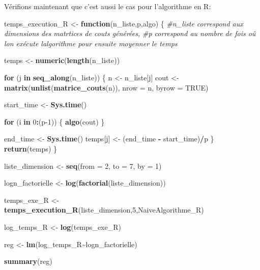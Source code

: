 \documentclass[
]{article}
\newenvironment{Shaded}{\begin{snugshade}}{\end{snugshade}}
\newcommand{\AttributeTok}[1]{\textcolor[rgb]{0.13,0.29,0.53}{#1}}
\newcommand{\CommentTok}[1]{\textcolor[rgb]{0.56,0.35,0.01}{\textit{#1}}}
\newcommand{\ConstantTok}[1]{\textcolor[rgb]{0.56,0.35,0.01}{#1}}
\newcommand{\ControlFlowTok}[1]{\textcolor[rgb]{0.13,0.29,0.53}{\textbf{#1}}}
\newcommand{\DecValTok}[1]{\textcolor[rgb]{0.00,0.00,0.81}{#1}}
\newcommand{\FunctionTok}[1]{\textcolor[rgb]{0.13,0.29,0.53}{\textbf{#1}}}
\newcommand{\NormalTok}[1]{#1}
\newcommand{\OtherTok}[1]{\textcolor[rgb]{0.56,0.35,0.01}{#1}}
\newcommand{\SpecialCharTok}[1]{\textcolor[rgb]{0.81,0.36,0.00}{\textbf{#1}}}
\begin{document}
Vérifions maintenant que c'est aussi le cas pour l'algorithme en R:

\begin{Shaded}
\begin{Highlighting}[]
\NormalTok{temps\_execution\_R }\OtherTok{\textless{}{-}} \ControlFlowTok{function}\NormalTok{(n\_liste,p,algo) \{}
  \CommentTok{\#n\_liste correspond aux dimensions des matrtices de couts générées,}
  \CommentTok{\#p correspond au nombre de fois oû l\textquotesingle{}on exécute l\textquotesingle{}algorithme pour ensuite moyenner le temps}

\NormalTok{  temps }\OtherTok{\textless{}{-}} \FunctionTok{numeric}\NormalTok{(}\FunctionTok{length}\NormalTok{(n\_liste))}
  
  \ControlFlowTok{for}\NormalTok{ (j }\ControlFlowTok{in} \FunctionTok{seq\_along}\NormalTok{(n\_liste)) \{}
\NormalTok{    n }\OtherTok{\textless{}{-}}\NormalTok{ n\_liste[j]}
\NormalTok{    cout }\OtherTok{\textless{}{-}} \FunctionTok{matrix}\NormalTok{(}\FunctionTok{unlist}\NormalTok{(}\FunctionTok{matrice\_couts}\NormalTok{(n)), }\AttributeTok{nrow =}\NormalTok{ n, }\AttributeTok{byrow =} \ConstantTok{TRUE}\NormalTok{)}
    
\NormalTok{    start\_time }\OtherTok{\textless{}{-}} \FunctionTok{Sys.time}\NormalTok{()}
    
    \ControlFlowTok{for}\NormalTok{ (i }\ControlFlowTok{in} \DecValTok{0}\SpecialCharTok{:}\NormalTok{(p}\DecValTok{{-}1}\NormalTok{)) \{}
    \FunctionTok{algo}\NormalTok{(cout)}
\NormalTok{    \}}
    
\NormalTok{    end\_time }\OtherTok{\textless{}{-}} \FunctionTok{Sys.time}\NormalTok{()}
\NormalTok{    temps[j] }\OtherTok{\textless{}{-}}\NormalTok{ (end\_time }\SpecialCharTok{{-}}\NormalTok{ start\_time)}\SpecialCharTok{/}\NormalTok{p}
\NormalTok{  \}}
  \FunctionTok{return}\NormalTok{(temps)}
\NormalTok{\}}
\end{Highlighting}
\end{Shaded}

\begin{Shaded}
\begin{Highlighting}[]
\NormalTok{liste\_dimension }\OtherTok{\textless{}{-}} \FunctionTok{seq}\NormalTok{(}\AttributeTok{from =} \DecValTok{2}\NormalTok{, }\AttributeTok{to =} \DecValTok{7}\NormalTok{, }\AttributeTok{by =} \DecValTok{1}\NormalTok{)}

\NormalTok{logn\_factorielle }\OtherTok{\textless{}{-}} \FunctionTok{log}\NormalTok{(}\FunctionTok{factorial}\NormalTok{(liste\_dimension))}

\NormalTok{temps\_exe\_R }\OtherTok{\textless{}{-}} \FunctionTok{temps\_execution\_R}\NormalTok{(liste\_dimension,}\DecValTok{5}\NormalTok{,NaiveAlgorithme\_R)}

\NormalTok{log\_temps\_R }\OtherTok{\textless{}{-}} \FunctionTok{log}\NormalTok{(temps\_exe\_R)}

\NormalTok{reg }\OtherTok{\textless{}{-}} \FunctionTok{lm}\NormalTok{(log\_temps\_R}\SpecialCharTok{\textasciitilde{}}\NormalTok{logn\_factorielle)}

\FunctionTok{summary}\NormalTok{(reg)}
\end{Highlighting}
\end{Shaded}
\end{document}
